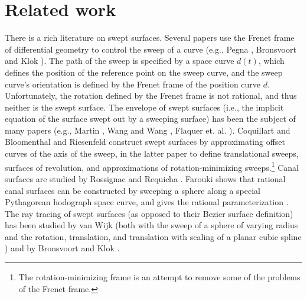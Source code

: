 
\section{Related work}
\label{sec:related}

There is a rich literature on swept surfaces.
Several papers use the Frenet frame of differential geometry
to control the sweep of a curve (e.g., Pegna \cite{pegna88},
Bronsvoort and Klok \cite{bronsklok85}).
The path of the sweep is specified by a space curve $d(t)$,
which defines the position of the reference point on the
sweep curve, and the sweep curve's orientation is defined by
the Frenet frame of the position curve $d$.
Unfortunately, the rotation defined by the Frenet frame is not rational,
and thus neither is the swept surface.  %
The envelope of swept surfaces (i.e., the implicit equation of the surface
swept out by a sweeping surface) has been the subject of many papers
(e.g., Martin \cite{martinsteph90}, Wang and Wang \cite{wangwang86},
Flaquer et. al. \cite{flaquer92}).
Coquillart \cite{coquillart87} and Bloomenthal and Riesenfeld 
\cite{bloom91} construct swept surfaces by approximating offset curves
of the axis of the sweep, in the latter paper to define translational sweeps,
surfaces of revolution, and approximations of rotation-minimizing 
sweeps.\footnote{The rotation-minimizing frame 
        is an attempt to remove some of the problems of the Frenet frame.}
Canal surfaces are studied by Rossignac and Requicha 
\cite{rossrequicha84,rossignac85}.
Farouki shows that rational canal surfaces can be constructed by sweeping
a sphere along a special Pythagorean hodograph space curve, and gives the
rational parameterization \cite{farouki94}.
The ray tracing of swept surfaces (as opposed to their Bezier surface 
definition) has been studied by van Wijk (both with the sweep of a sphere
of varying radius \cite{vanwijk84euro} and the rotation, translation,
and translation with scaling of a planar cubic spline \cite{vanwijk84tog})
and by Bronsvoort and Klok \cite{bronsklok85}.

